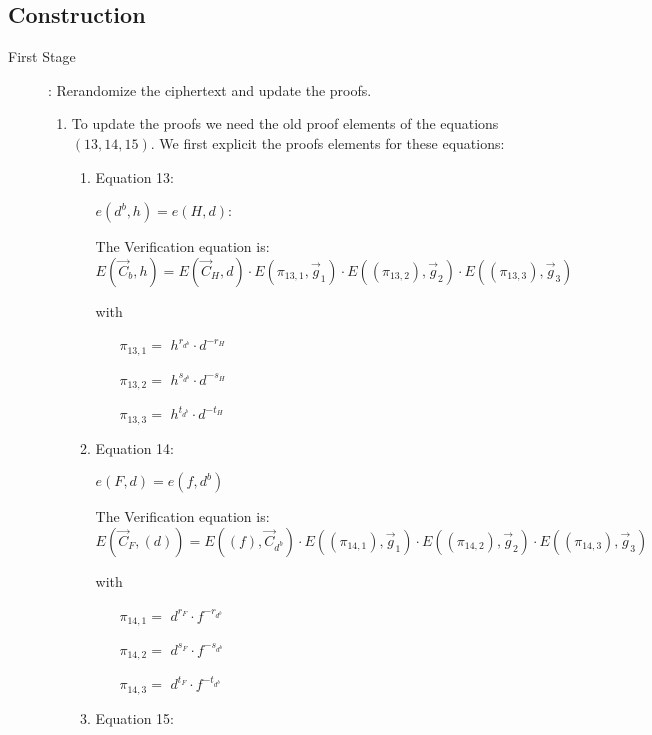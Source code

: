 \subsection{Construction}

\begin{description}
\item[First Stage]: Rerandomize the ciphertext and update the proofs.
  \begin{enumerate}
  \item To update the proofs we need the old proof elements of the equations $(13, 14, 15)$. We first explicit the proofs elements for these equations:
    \begin{enumerate}
    \item Equation 13:

      $e(\boxed{d^b},h) = e(\boxed{H}, d)$: 
      
      The Verification equation is: $E(\vec{C}_b, h) = E(\vec{C}_{H}, d) \cdot E(\pi_{13,1}, \vec{g}_1)\cdot E((\pi_{13,2}), \vec{g}_2)\cdot E((\pi_{13,3}), \vec{g}_3)$

      with
      \begin{itemize}
      \item[$\pi_{13,1} = $] $h^{r_{d^b}} \cdot d^{-r_{H}}$
      \item[$\pi_{13,2} = $] $h^{s_{d^b}} \cdot d^{-s_{H}}$
      \item[$\pi_{13,3} = $] $h^{t_{d^b}} \cdot d^{-t_{H}}$
      \end{itemize}
      
    \item Equation 14:

      $e(\boxed{F},d) = e(f, \boxed{d^b})$

      The Verification equation is: $E(\vec{C}_F, (d)) = E((f), \vec{C}_{d^b}) \cdot E((\pi_{14,1}), \vec{g}_1)\cdot E((\pi_{14,2}), \vec{g}_2)\cdot E((\pi_{14,3}), \vec{g}_3)$

      with

      \begin{itemize}
      \item[$\pi_{14,1} = $] $d^{r_F} \cdot f^{-r_{d^b}}$    
      \item[$\pi_{14,2} = $] $d^{s_F} \cdot f^{-s_{d^b}}$    
      \item[$\pi_{14,3} = $] $d^{t_F} \cdot f^{-t_{d^b}}$
      \end{itemize}
      
    \item Equation 15:


\end{enumerate}
\end{enumerate}
\end{description}
